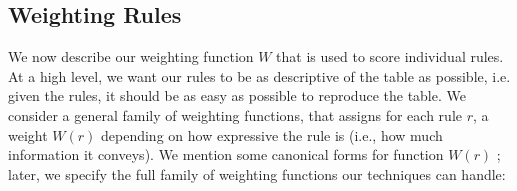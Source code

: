 \documentclass[10pt,journal,compsoc]{IEEEtran}
\newcommand{\eat}[1]{}
\newcommand{\papertext}[1]{#1}
\begin{document}
\subsection{Weighting Rules}
\label{sec:weighting}
We now describe our weighting function $W$ that is used to score individual rules. 
At a high level, we want our rules to be as descriptive of the table as possible, i.e. given the rules, it should be as easy as possible to reproduce the table. We consider a general family of weighting functions, that assigns for each rule $r$, a weight $W(r)$ depending on how expressive the rule is (i.e., how much information
it conveys). We mention some canonical forms for function $W(r)$ \eat{(their detailed interpretations are described in the technical report)}; later, we specify the full
family of weighting functions our techniques can handle:

\end{document}
